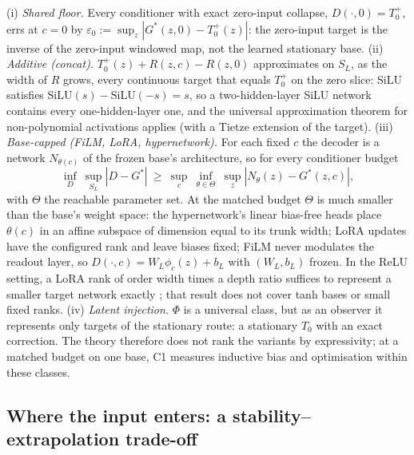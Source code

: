 \begin{remark}\label{rem:m1-capacity}
(i) \emph{Shared floor.} Every conditioner with exact zero-input collapse, $D(\cdot,0)=T_0^+$, errs at $c=0$ by
$\varepsilon_0:=\sup_z|G^*(z,0)-T_0^+(z)|$: the zero-input target is the inverse of the zero-input windowed map,
not the learned stationary base. (ii) \emph{Additive (concat).} $T_0^+(z)+R(z,c)-R(z,0)$ approximates on $S_L$, as
the width of $R$ grows, every continuous target that equals $T_0^+$ on the zero slice: SiLU satisfies
$\mathrm{SiLU}(s)-\mathrm{SiLU}(-s)=s$, so a two-hidden-layer SiLU network contains every one-hidden-layer one, and
the universal approximation theorem for non-polynomial activations \citep{leshno1993multilayer} applies (with a
Tietze extension of the target). (iii) \emph{Base-capped (FiLM, LoRA, hypernetwork).} For each fixed $c$ the decoder
is a network $N_{\theta(c)}$ of the frozen base's architecture, so for every conditioner budget
\[
\inf_{D}\ \sup_{S_L}|D-G^*|\ \ge\ \sup_{c}\ \inf_{\theta\in\Theta}\ \sup_z|N_\theta(z)-G^*(z,c)|,
\]
with $\Theta$ the reachable parameter set. At the matched budget $\Theta$ is much smaller than the base's weight
space: the hypernetwork's linear bias-free heads place $\theta(c)$ in an affine subspace of dimension equal to its
trunk width; LoRA updates have the configured rank and leave biases fixed; FiLM never modulates the readout layer, so
$D(\cdot,c)=W_L\phi_c(z)+b_L$ with $(W_L,b_L)$ frozen. In the ReLU setting, a LoRA rank of order width times a depth
ratio suffices to represent a smaller target network exactly \citep{zeng2024expressive}; that result does not cover
tanh bases or small fixed ranks. (iv) \emph{Latent injection.} $\Phi$ is a universal class, but as an observer it
represents only targets of the stationary route: a stationary $T_0$ with an exact correction.
The theory therefore does not rank the variants by expressivity; at a matched budget on one base, C1 measures
inductive bias and optimisation within these classes.
\end{remark}

\subsection{Where the input enters: a stability--extrapolation trade-off}

